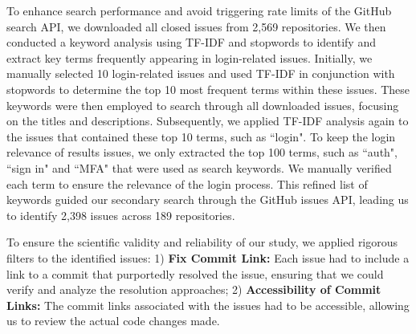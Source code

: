 To enhance search performance and avoid triggering rate limits of the GitHub search API, we downloaded all closed issues from 2,569 repositories. We then conducted a keyword analysis using TF-IDF \cite{aizawa2003information} and stopwords \cite{stopwords} to identify and extract key terms frequently appearing in login-related issues. Initially, we manually selected 10 login-related issues and used TF-IDF in conjunction with stopwords to determine the top 10 most frequent terms within these issues. These keywords were then employed to search through all downloaded issues, focusing on the titles and descriptions. Subsequently, we applied TF-IDF analysis again to the issues that contained these top 10 terms, such as ``login". To keep the login relevance of results issues, we only extracted the top 100 terms, such as ``auth", ``sign in" and ``MFA" that were used as search keywords. We manually verified each term to ensure the relevance of the login process. This refined list of keywords guided our secondary search through the GitHub issues API, leading us to identify 2,398 issues across 189 repositories.

To ensure the scientific validity and reliability of our study, we applied rigorous filters to the identified issues: 1) \textbf{Fix Commit Link:} Each issue had to include a link to a commit that purportedly resolved the issue, ensuring that we could verify and analyze the resolution approaches; 2) \textbf{Accessibility of Commit Links:} The commit links associated with the issues had to be accessible, allowing us to review the actual code changes made.



